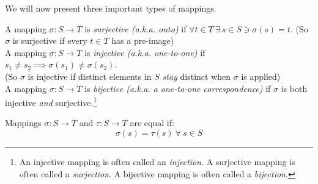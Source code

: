 \noindent We will now present three important types of mappings.

\begin{definition}
\label{def:surj_inj_bij}
A mapping $\sigma: S\rightarrow T$ is \textit{surjective (a.k.a. onto)} if $\forall t\in T \ \exists \ s\in S \ni \sigma(s)=t$. (So $\sigma$ is surjective if every $t\in T$ has a pre-image)\steezybreak\\
A mapping $\sigma: S\rightarrow T$ is \textit{injective (a.k.a. one-to-one)} if $s_1\neq s_2 \implies \sigma(s_1)\neq \sigma(s_2)$. \\(So $\sigma$ is injective if distinct elements in $S$ \textit{stay} distinct when $\sigma$ is applied)\steezybreak\\
A mapping $\sigma: S\rightarrow T$ is \textit{bijective (a.k.a. a one-to-one correspondence)} if $\sigma$ is both injective \textit{and} surjective.\footnote{An injective mapping is often called an \textit{injection}. A surjective mapping is often called a \textit{surjection}. A bijective mapping is often called a \textit{bijection}.}
\end{definition}
\begin{definition}
Mappings $\sigma : S \rightarrow T$ and $\tau: S \rightarrow T$ are equal if:
\begin{equation}
    \sigma(s)=\tau(s) \ \forall \ s\in S\nonumber
\end{equation}
\end{definition}
